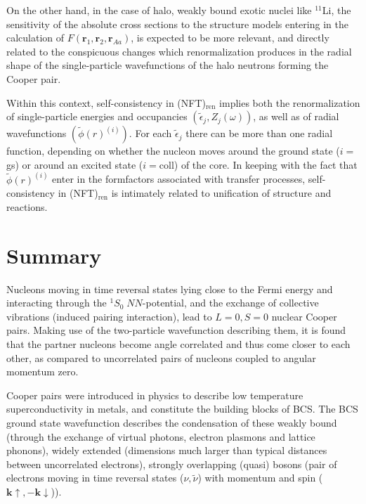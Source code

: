 On the other hand, in the case of halo, weakly bound exotic nuclei like $^{11}$Li, the sensitivity of the absolute cross sections to the structure models entering in the calculation of $F(\mathbf r_1,\mathbf r_2,\mathbf r_{Aa})$, is expected to be more relevant, and directly related to the conspicuous changes which renormalization produces in the radial shape of the single-particle wavefunctions of the halo neutrons forming the Cooper pair. 



Within this context, self-consistency in (NFT)$_{\text{ren}}$ implies both the renormalization of single-particle energies and occupancies $(\tilde\epsilon_j,Z_j(\omega))$, as well as of radial wavefunctions $(\tilde\phi(r)^{(i)})$. For each $\tilde\epsilon_j$ there can be more than one radial function, depending on whether the nucleon moves around the ground state ($i=$gs) or around an excited state ($i=$coll) of the core. In keeping with the fact that $\tilde{\phi}(r)^{(i)}$ enter in  the formfactors associated with transfer processes, self-consistency in (NFT)$_{\text{ren}}$ is intimately related to unification of structure and reactions. 
 \section{Summary}
Nucleons moving in time reversal states lying close to the Fermi energy and interacting through the  $^1S_0\;NN$-potential, and the exchange of collective vibrations (induced pairing interaction), lead to $L=0, S=0$ nuclear Cooper pairs. Making use of the two-particle wavefunction describing them, it is found that the partner nucleons become angle correlated and thus come closer to each other, as compared to  uncorrelated pairs of nucleons coupled to angular momentum zero.

Cooper pairs were introduced in physics to describe low temperature superconductivity in metals, and constitute the building blocks of BCS. The BCS ground state wavefunction describes the condensation of these weakly bound (through the exchange of virtual photons, electron plasmons and lattice phonons), widely extended (dimensions much larger than typical distances between uncorrelated electrons), strongly overlapping (quasi) bosons (pair of electrons moving in time reversal states ($\nu,\tilde \nu$) with momentum and spin ($\mathbf k\uparrow,-\mathbf k\downarrow$)).

